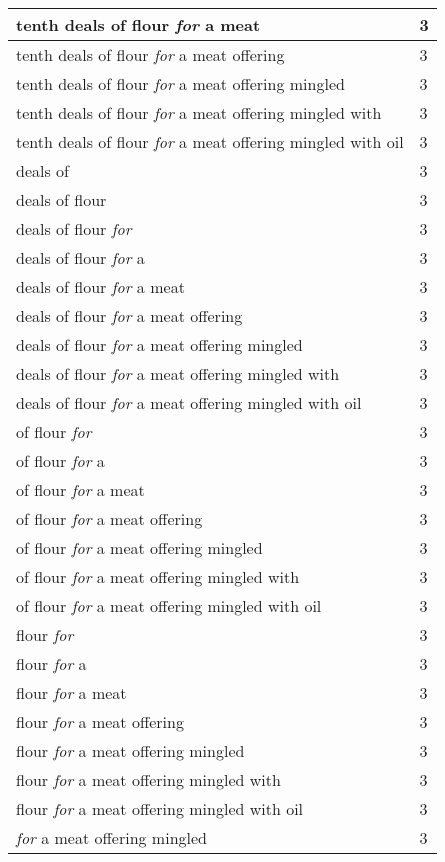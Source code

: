 \begin{center}
\begin{longtable}{|p{3.0in}|p{0.5in}|}
tenth deals of flour \emph{for} a meat & 3\\ \hline 
tenth deals of flour \emph{for} a meat offering & 3\\ \hline 
tenth deals of flour \emph{for} a meat offering mingled & 3\\ \hline 
tenth deals of flour \emph{for} a meat offering mingled with & 3\\ \hline 
tenth deals of flour \emph{for} a meat offering mingled with oil & 3\\ \hline 
deals of & 3\\ \hline 
deals of flour & 3\\ \hline 
deals of flour \emph{for} & 3\\ \hline 
deals of flour \emph{for} a & 3\\ \hline 
deals of flour \emph{for} a meat & 3\\ \hline 
deals of flour \emph{for} a meat offering & 3\\ \hline 
deals of flour \emph{for} a meat offering mingled & 3\\ \hline 
deals of flour \emph{for} a meat offering mingled with & 3\\ \hline 
deals of flour \emph{for} a meat offering mingled with oil & 3\\ \hline 
of flour \emph{for} & 3\\ \hline 
of flour \emph{for} a & 3\\ \hline 
of flour \emph{for} a meat & 3\\ \hline 
of flour \emph{for} a meat offering & 3\\ \hline 
of flour \emph{for} a meat offering mingled & 3\\ \hline 
of flour \emph{for} a meat offering mingled with & 3\\ \hline 
of flour \emph{for} a meat offering mingled with oil & 3\\ \hline 
flour \emph{for} & 3\\ \hline 
flour \emph{for} a & 3\\ \hline 
flour \emph{for} a meat & 3\\ \hline 
flour \emph{for} a meat offering & 3\\ \hline 
flour \emph{for} a meat offering mingled & 3\\ \hline 
flour \emph{for} a meat offering mingled with & 3\\ \hline 
flour \emph{for} a meat offering mingled with oil & 3\\ \hline 
\emph{for} a meat offering mingled & 3\\ \hline 

\end{longtable}
\end{center}
